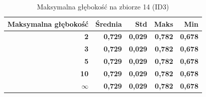 \begin{table}[htbp]
\centering
\small
\setlength{\tabcolsep}{6pt}
\renewcommand{\arraystretch}{1.2}
\caption{Maksymalna głębokość na zbiorze 14 (ID3)}
\label{tab:ID3_max_depth_14}
\begin{tabular}{r|r|r|r|r}
\toprule
Maksymalna głębokość & Średnia & Std & Maks & Min \\
\hline
\textbf{2} & \textbf{0,729} & \textbf{0,029} & \textbf{0,782} & \textbf{0,678} \\
\textbf{3} & \textbf{0,729} & \textbf{0,029} & \textbf{0,782} & \textbf{0,678} \\
\textbf{5} & \textbf{0,729} & \textbf{0,029} & \textbf{0,782} & \textbf{0,678} \\
\textbf{10} & \textbf{0,729} & \textbf{0,029} & \textbf{0,782} & \textbf{0,678} \\
\textbf{$\infty$} & \textbf{0,729} & \textbf{0,029} & \textbf{0,782} & \textbf{0,678} \\
\bottomrule
\end{tabular}
\end{table}